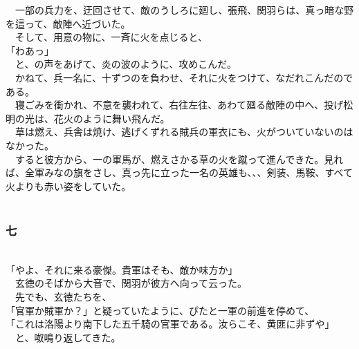 \documentclass[
  paper=a5,
  fontsize=10pt,
  jafontsize=9.5pt,
  tate,                  %
  open_bracket_pos=nibu, %
]{jlreq}
\begin{document}
　一部の兵力を、迂回させて、敵のうしろに廻し、張飛、関羽らは、真っ暗な野を這って、敵陣へ近づいた。\\


　そして、用意の物に、一斉に火を点じると、\\


「わあっ」\\


　と、の声をあげて、炎の波のように、攻めこんだ。\\


　かねて、兵一名に、十ずつのを負わせ、それに火をつけて、なだれこんだのである。\\


　寝ごみを衝かれ、不意を襲われて、右往左往、あわて廻る敵陣の中へ、投げ松明の光は、花火のように舞い飛んだ。\\


　草は燃え、兵舎は焼け、逃げくずれる賊兵の軍衣にも、火がついていないのはなかった。\\


　すると彼方から、一の軍馬が、燃えさかる草の火を蹴って進んできた。見れば、全軍みなの旗をさし、真っ先に立った一名の英雄も、、、剣装、馬鞍、すべて火よりも赤い姿をしていた。\\

\\

\subsubsection{七}

\\


「やよ、それに来る豪傑。貴軍はそも、敵か味方か」\\


　玄徳のそばから大音で、関羽が彼方へ向って云った。\\


　先でも、玄徳たちを、\\


「官軍か賊軍か？」と疑っていたように、ぴたと一軍の前進を停めて、\\


「これは洛陽より南下した五千騎の官軍である。汝らこそ、黄匪に非ずや」\\


　と、呶鳴り返してきた。\\
\end{document}
